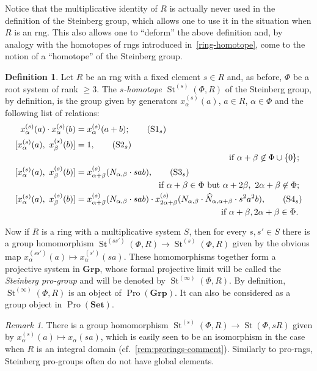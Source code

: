 \documentclass{article}
\numberwithin{equation}{section}
\theoremstyle{definition}
\newtheorem{df}[lemma]{Definition} \Crefname{df}{Definition}{Definitions}
\theoremstyle{remark}
\newtheorem{rem}[lemma]{Remark}
\DeclareMathOperator\St{St}
\DeclareMathOperator{\Pro}{Pro}
\newcommand{\Set}{\mathbf{Set}}
\newcommand{\Group}{\mathbf{Grp}}
\begin{document}
Notice that the multiplicative identity of $R$ is actually never used in the definition of the Steinberg group, 
 which allows one to use it in the situation when $R$ is an rng.
This also allows one to ``deform'' the above definition and, by analogy with the homotopes of rngs introduced in~\cref{ring-homotope}, come to the notion of a ``homotope'' of the Steinberg group.
\begin{df}\label{def:Steinberg-homotope}
 Let $R$ be an rng with a fixed element $s \in R$ and, as before, $\Phi$ be a root system of rank $\geq 3$.
 The {\it $s$-homotope $\St^{(s)}(\Phi, R)$} of the Steinberg group, by definition, is the group given by generators $x_\alpha^{(s)}(a)$, $a\in R$, $\alpha\in\Phi$ and the following list of relations: \begin{align}
 x^{(s)}_\alpha(a) \cdot x^{(s)}_\alpha(b)    &= x^{(s)}_\alpha(a+b); \tag{S$1_s$} \label{S1} \\
 [x^{(s)}_\alpha(a),\ x^{(s)}_\beta(b)] &= 1, \tag{S$2_s$} \label{S2} \\ 
 \multispan2{\hfil if $\alpha + \beta \not\in\Phi \cup \{0\};$} \nonumber \\
 [x^{(s)}_\alpha(a),\ x^{(s)}_\beta(b)] &= x^{(s)}_{\alpha + \beta}(N_{\alpha,\beta} \cdot sab), \tag{S$3_s$} \label{S3} \\
 \multispan2{\hfill if $\alpha+\beta\in\Phi$ but $\alpha+2\beta,\ 2\alpha+\beta\not\in\Phi;$} \nonumber \\
 [x^{(s)}_\alpha(a),\ x^{(s)}_\beta(b)] &= x^{(s)}_{\alpha + \beta}(N_{\alpha,\beta} \cdot sab) \cdot x^{(s)}_{2\alpha+\beta}(N_{\alpha,\beta} \cdot \widehat{N}_{\alpha, \alpha+\beta}\cdot s^2a^2b), \tag{S$4_s$} \label{S4} \\ \multispan2{ \hfill if $\alpha+\beta,2\alpha+\beta\in\Phi$.} \nonumber  \end{align} 
 
 Now if $R$ is a ring with a multiplicative system $S$, then for every $s, s' \in S$ there is a group homomorphism $\St^{(ss')}(\Phi, R) \to \St^{(s)}(\Phi, R)$ given by the obvious map $x_\alpha^{(ss')}(a) \mapsto x_\alpha^{(s')}(sa)$.
 These homomorphisms together form a projective system in $\Group$, whose formal projective limit will be called the {\it Steinberg pro-group} and will be denoted by $\St^{(\infty)}(\Phi, R)$.
 By definition, $\St^{(\infty)}(\Phi, R)$ is an object of $\Pro(\Group)$. It can also be considered as a group object in $\Pro(\Set)$. 
\end{df}

\begin{rem} \label{rem:pro-Steinberg-comment}
There is a group homomorphism $\St^{(s)}(\Phi, R) \to \St(\Phi, sR)$ given by $x_\alpha^{(s)}(a)\mapsto x_\alpha(sa)$, which is easily seen to be an isomorphism in the case when $R$ is an integral domain (cf.~\cref{rem:prorings-comment}). Similarly to pro-rngs, Steinberg pro-groups often do not have global elements.
\end{rem}
 
\end{document}
